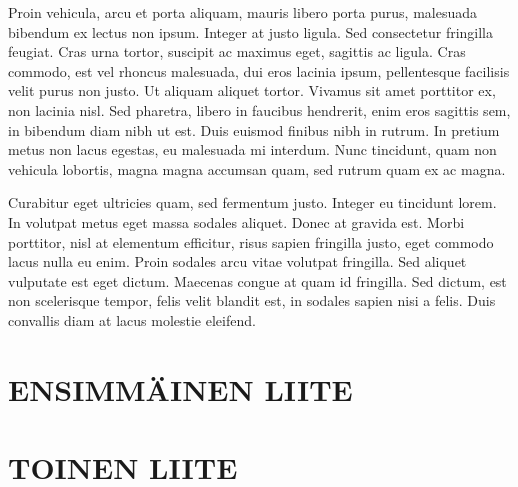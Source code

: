 Proin vehicula, arcu et porta aliquam, mauris libero porta purus, malesuada bibendum ex lectus non ipsum. Integer at justo ligula. Sed consectetur fringilla feugiat. Cras urna tortor, suscipit ac maximus eget, sagittis ac ligula. Cras commodo, est vel rhoncus malesuada, dui eros lacinia ipsum, pellentesque facilisis velit purus non justo. Ut aliquam aliquet tortor. Vivamus sit amet porttitor ex, non lacinia nisl. Sed pharetra, libero in faucibus hendrerit, enim eros sagittis sem, in bibendum diam nibh ut est. Duis euismod finibus nibh in rutrum. In pretium metus non lacus egestas, eu malesuada mi interdum. Nunc tincidunt, quam non vehicula lobortis, magna magna accumsan quam, sed rutrum quam ex ac magna.

Curabitur eget ultricies quam, sed fermentum justo. Integer eu tincidunt lorem. In volutpat metus eget massa sodales aliquet. Donec at gravida est. Morbi porttitor, nisl at elementum efficitur, risus sapien fringilla justo, eget commodo lacus nulla eu enim. Proin sodales arcu vitae volutpat fringilla. Sed aliquet vulputate est eget dictum. Maecenas congue at quam id fringilla. Sed dictum, est non scelerisque tempor, felis velit blandit est, in sodales sapien nisi a felis. Duis convallis diam at lacus molestie eleifend.

\pagebreak
\appendix

\section{ENSIMMÄINEN LIITE}

\section{TOINEN LIITE}



